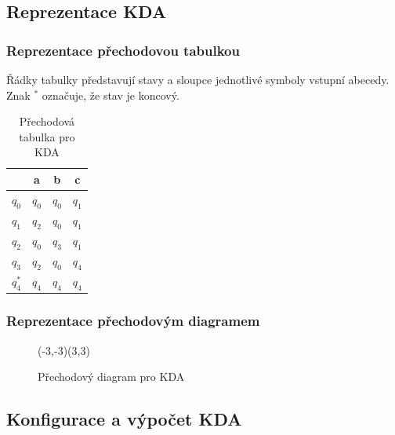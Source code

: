 \documentclass[10pt, a4paper, titlepage]{article}
\theoremstyle{note}
\begin{document}
\subsection{Reprezentace KDA}
\subsubsection{Reprezentace přechodovou tabulkou}

Řádky tabulky představují stavy a sloupce jednotlivé symboly vstupní abecedy. Znak $^*$ označuje, že stav je koncový.
\begin{table}[h]
\begin{center}
\begin{tabular}{r || c | c | c}
 & a & b & c \\
\hline
 $q_0$ & $q_0$ & $q_0$ & $q_1$ \\
 $q_1$ & $q_2$ & $q_0$ & $q_1$ \\
 $q_2$ & $q_0$ & $q_3$ & $q_1$ \\
 $q_3$ & $q_2$ & $q_0$ & $q_4$ \\
 $q_4^*$ & $q_4$ & $q_4$ & $q_4$ \\
\end{tabular}
\end{center}
\caption{Přechodová tabulka pro KDA}
\end{table}


\subsubsection{Reprezentace přechodovým diagramem}

\begin{figure}[ht]
\begin{center}
\begin{VCPicture}{(-3,-3)(3,3)}


\end{VCPicture}
\end{center}
\caption{Přechodový diagram pro KDA}
\end{figure}

\subsection{Konfigurace a výpočet KDA}
\end{document}

